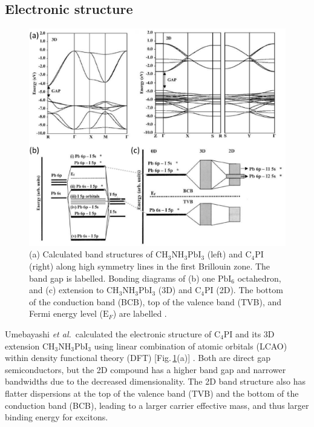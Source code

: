 \subsection{Electronic structure}
\begin{figure}[h!]
\centering
\includegraphics[width=\textwidth]{Fig12}
\caption{(a) Calculated band structures of $\textrm{CH}_3\textrm{NH}_3\textrm{PbI}_3$ (left) and $\textrm{C}_{4}$PI (right) along high symmetry lines in the first Brillouin zone. The band gap is labelled. Bonding diagrams of (b) one $\textrm{PbI}_6$ octahedron, and (c) extension to $\textrm{CH}_3\textrm{NH}_3\textrm{PbI}_3$ (3D) and $\textrm{C}_{4}$PI (2D). The bottom of the conduction band (BCB), top of the valence band (TVB), and Fermi energy level ($\textrm{E}_F$) are labelled \cite{Umebayashi2003}.}
\label{2Fig12}
\end{figure}
Umebayashi \textit{et al.}\ calculated the electronic structure of $\textrm{C}_{4}$PI and its 3D extension $\textrm{CH}_3\textrm{NH}_3\textrm{PbI}_3$ using linear combination of atomic orbitals (LCAO) within density functional theory (DFT) [Fig.\,\ref{2Fig12}(a)] \cite{Umebayashi2003}. Both are direct gap semiconductors, but the 2D compound has a higher band gap and narrower bandwidths due to the decreased dimensionality. The 2D band structure also has flatter dispersions at the top of the valence band (TVB) and the bottom of the conduction band (BCB), leading to a larger carrier effective mass, and thus larger binding energy for excitons. 

